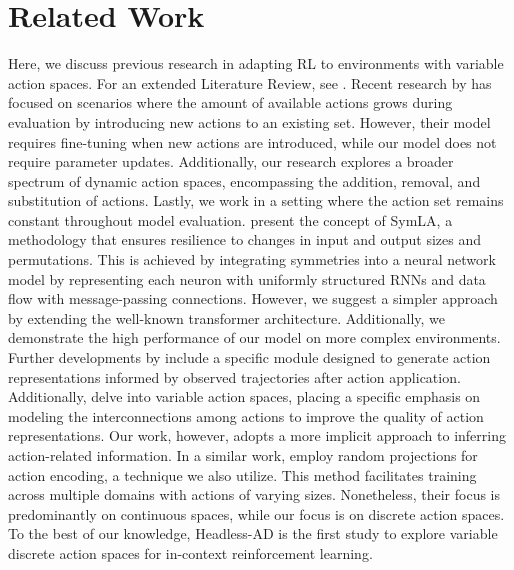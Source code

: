 \documentclass{article}
\theoremstyle{plain}
\theoremstyle{definition}
\theoremstyle{remark}
\begin{document}
\section{Related Work}
Here, we discuss previous research in adapting RL to environments with variable action spaces. For an extended Literature Review, see .
Recent research by \citet{chandak2020lifelong, ye2023action} has focused on scenarios where the amount of available actions grows during evaluation by introducing new actions to an existing set. However, their model requires fine-tuning when new actions are introduced, while our model does not require parameter updates. Additionally, our research explores a broader spectrum of dynamic action spaces, encompassing the addition, removal, and substitution of actions. Lastly, we work in a setting where the action set remains constant throughout model evaluation.
\citet{kirsch2022introducing} present the concept of SymLA, a methodology that ensures resilience to changes in input and output sizes and permutations. This is achieved by integrating symmetries into a neural network model by representing each neuron with uniformly structured RNNs and data flow with message-passing connections. However, we suggest a simpler approach by extending the well-known transformer architecture. Additionally, we demonstrate the high performance of our model on more complex environments.
Further developments by \citet{jain2020generalization} include a specific module designed to generate action representations informed by observed trajectories after action application. Additionally, \citet{jain2021know} delve into variable action spaces, placing a specific emphasis on modeling the interconnections among actions to improve the quality of action representations. Our work, however, adopts a more implicit approach to inferring action-related information.
In a similar work, \citet{lu2023structured, kirsch2023towards} employ random projections for action encoding, a technique we also utilize. This method facilitates training across multiple domains with actions of varying sizes. Nonetheless, their focus is predominantly on continuous spaces, while our focus is on discrete action spaces.
To the best of our knowledge, Headless-AD is the first study to explore variable discrete action spaces for in-context reinforcement learning.
\end{document}
